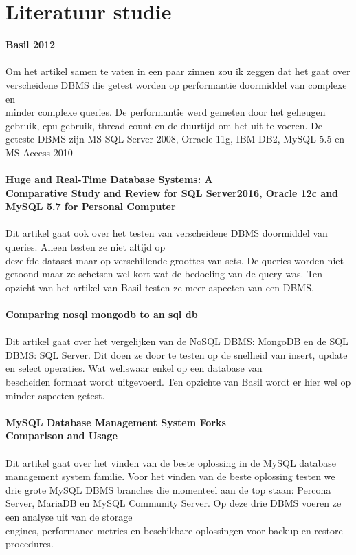 \documentclass[fleqn,10pt]{artikeltin}
\begin{document}
\section{Literatuur studie}
\label{sec:LiteratuurStudie}
\textbf{Basil 2012}\\\\
Om het artikel samen te vaten in een paar zinnen zou ik zeggen dat het gaat over verscheidene DBMS die getest worden op performantie doormiddel van complexe en \\minder complexe queries. De performantie werd gemeten door het geheugen gebruik, cpu gebruik, thread count en de duurtijd om het uit te voeren. De geteste DBMS zijn MS SQL Server 2008, Orracle 11g, IBM DB2, MySQL 5.5 en MS Access 2010\\\\
\textbf{Huge and Real-Time Database Systems: A \\Comparative Study and Review for SQL Server2016, Oracle 12c and MySQL 5.7 for Personal Computer}\\\\
Dit artikel gaat ook over het testen van verscheidene DBMS doormiddel van queries. Alleen testen ze niet altijd op \\dezelfde dataset maar op verschillende groottes van sets. De queries worden niet getoond maar ze schetsen wel kort wat de bedoeling van de query was. Ten opzicht van het artikel van Basil testen ze meer aspecten van een DBMS.\\\\
\textbf{Comparing nosql mongodb to an sql db}\\\\
Dit artikel gaat over het vergelijken van de NoSQL DBMS: MongoDB en de SQL DBMS: SQL Server. Dit doen ze door te testen op de snelheid van insert, update en select operaties. Wat weliswaar enkel op een database van \\bescheiden formaat wordt uitgevoerd. Ten opzichte van Basil wordt er hier wel op minder aspecten getest.\\\\
\textbf{MySQL Database Management System Forks \\Comparison and Usage}\\\\
Dit artikel gaat over het vinden van de beste oplossing in de MySQL database management system familie. Voor het vinden van de beste oplossing testen we drie grote MySQL DBMS branches die momenteel aan de top staan: Percona Server, MariaDB en MySQL Community Server. Op deze drie DBMS voeren ze een analyse uit van de storage \\engines, performance metrics en beschikbare oplossingen voor backup en restore procedures.\\\\
\end{document}
